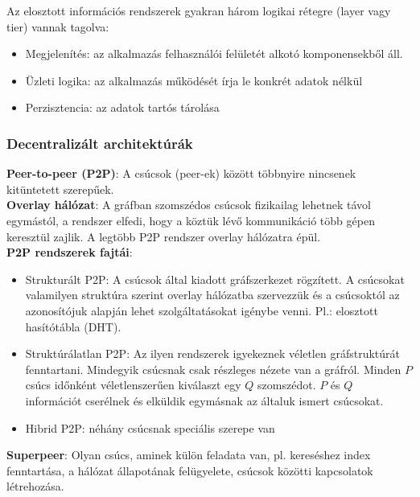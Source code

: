\documentclass[margin=0px]{article}
\begin{document}
	Az elosztott információs rendszerek gyakran három logikai rétegre (layer vagy tier) vannak tagolva:
	
	\begin{itemize}
		\item	Megjelenítés: az alkalmazás felhasználói felületét alkotó komponensekből áll.
		\item	Üzleti logika: az alkalmazás működését írja le konkrét adatok nélkül
		\item	Perzisztencia: az adatok tartós tárolása
	\end{itemize}
	
	\subsubsection{Decentralizált architektúrák}
	
	\noindent \textbf{Peer-to-peer (P2P)}: A csúcsok (peer-ek) között többnyire nincsenek kitüntetett szerepűek.\\
	
	\noindent \textbf{Overlay hálózat}: A gráfban szomszédos csúcsok fizikailag lehetnek távol egymástól,
	a rendszer elfedi, hogy a köztük lévő kommunikáció több gépen keresztül zajlik. A legtöbb P2P
	rendszer overlay hálózatra épül.\\
	
	\noindent \textbf{P2P rendszerek fajtái}:
	\begin{itemize}
		\item	Strukturált P2P: A csúcsok által kiadott gráfszerkezet rögzített. A csúcsokat valamilyen struktúra
		szerint overlay hálózatba szervezzük és a csúcsoktól az azonosítójuk alapján lehet szolgáltatásokat
		igénybe venni. Pl.: elosztott hasítótábla (DHT).
		
		\item	Struktúrálatlan P2P:  Az ilyen rendszerek igyekeznek véletlen gráfstruktúrát fenntartani. Mindegyik
		csúcsnak csak részleges nézete van a gráfról. Minden $P$ csúcs időnként véletlenszerűen kiválaszt egy $Q$
		szomszédot. $P$ és $Q$ információt cserélnek és elküldik egymásnak az általuk ismert csúcsokat. 
		
		\item	Hibrid P2P: néhány csúcsnak speciális szerepe van
	\end{itemize}
	
	\noindent \textbf{Superpeer}: Olyan csúcs, aminek külön feladata van, pl. kereséshez index fenntartása, a hálózat
	állapotának felügyelete, csúcsok közötti kapcsolatok létrehozása.
	
\end{document}
